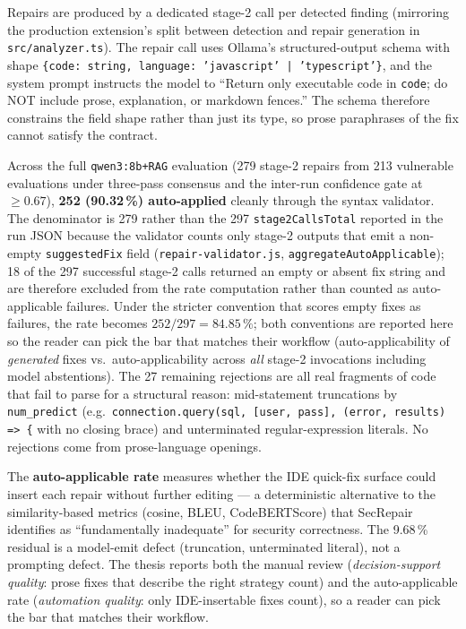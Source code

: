 Repairs are produced by a dedicated stage-2 call per detected finding (mirroring the production extension's split between detection and repair generation in \texttt{src/analyzer.ts}). The repair call uses Ollama's structured-output schema with shape \texttt{\{code: string, language: 'javascript' | 'typescript'\}}, and the system prompt instructs the model to ``Return only executable code in \texttt{code}; do NOT include prose, explanation, or markdown fences.'' The schema therefore constrains the field shape rather than just its type, so prose paraphrases of the fix cannot satisfy the contract.

Across the full \texttt{qwen3:8b+RAG} evaluation (279 stage-2 repairs from 213 vulnerable evaluations under three-pass consensus and the inter-run confidence gate at $\geq 0.67$), \textbf{252 (90.32\,\%) auto-applied} cleanly through the syntax validator. The denominator is 279 rather than the 297 \texttt{stage2CallsTotal} reported in the run JSON because the validator counts only stage-2 outputs that emit a non-empty \texttt{suggestedFix} field (\texttt{repair-validator.js}, \texttt{aggregateAutoApplicable}); 18 of the 297 successful stage-2 calls returned an empty or absent fix string and are therefore excluded from the rate computation rather than counted as auto-applicable failures. Under the stricter convention that scores empty fixes as failures, the rate becomes $252 / 297 = 84.85\,\%$; both conventions are reported here so the reader can pick the bar that matches their workflow (auto-applicability of \emph{generated} fixes vs.\ auto-applicability across \emph{all} stage-2 invocations including model abstentions). The 27 remaining rejections are all real fragments of code that fail to parse for a structural reason: mid-statement truncations by \texttt{num\_predict} (e.g.\ \texttt{connection.query(sql, [user, pass], (error, results) => \{} with no closing brace) and unterminated regular-expression literals. No rejections come from prose-language openings.

The \textbf{auto-applicable rate} measures whether the IDE quick-fix surface could insert each repair without further editing --- a deterministic alternative to the similarity-based metrics (cosine, BLEU, CodeBERTScore) that SecRepair~\cite[\S III-C3]{islam2024secrepair} identifies as ``fundamentally inadequate'' for security correctness. The 9.68\,\% residual is a model-emit defect (truncation, unterminated literal), not a prompting defect. The thesis reports both the manual review (\emph{decision-support quality}: prose fixes that describe the right strategy count) and the auto-applicable rate (\emph{automation quality}: only IDE-insertable fixes count), so a reader can pick the bar that matches their workflow.
